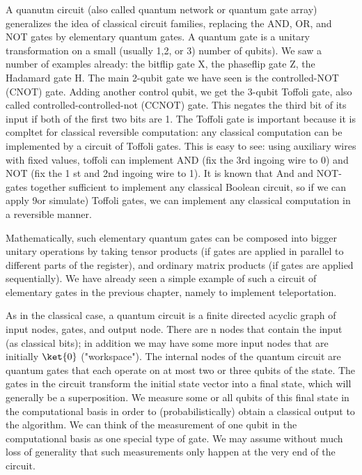 \documentclass[12pt, oneside]{book}
\theoremstyle{definition}
\theoremstyle{definition}
\theoremstyle{remark}
\begin{document}
A quanutm circuit (also called quantum network or quantum gate array) generalizes the idea of classical circuit families, replacing the AND, OR, and NOT gates by elementary quantum gates. A quantum gate is a unitary transformation on a small (usually 1,2, or 3) number of qubits). We saw a number of examples already: the bitflip gate X, the phaseflip gate Z, the Hadamard gate H. The main 2-qubit gate we have seen is the controlled-NOT (CNOT) gate. Adding another control qubit, we get the 3-qubit Toffoli gate, also called controlled-controlled-not (CCNOT) gate. This negates the third bit of its input if both of the first two bits are 1. The Toffoli gate is important because it is compltet for classical reversible computation: any classical computation can be implemented by a circuit of Toffoli gates. This is easy to see: using auxiliary wires with fixed values, toffoli can implement AND (fix the 3rd ingoing wire to 0) and NOT (fix the 1 st and 2nd ingoing wire to 1). It is known that And and NOT-gates together sufficient to implement any classical Boolean circuit, so if we can apply 9or simulate) Toffoli gates, we can implement any classical computation in a reversible manner.

Mathematically, such elementary quantum gates can be composed into bigger unitary operations by taking tensor products (if gates are applied in parallel to different parts of the register), and ordinary matrix products (if gates are applied sequentially). We have already seen a simple example of such a circuit of elementary gates in the previous chapter, namely to implement teleportation.

As in the classical case, a quantum circuit is a finite directed acyclic graph of input nodes, gates, and output node. There are n nodes that contain the input (as classical bits); in addition we may have some more input nodes that are initially $\ket{0}$ ("workspace"). The internal nodes of the quantum circuit are quantum gates that each operate on at most two or three qubits of the state. The gates in the circuit transform the initial state vector into a final state, which will generally be a superposition. We measure some or all qubits of this final state in the computational basis in order to (probabilistically) obtain a classical output to the algorithm. We can think of the measurement of one qubit in the computational basis as one special type of gate. We may assume without much loss of generality that such measurements only happen at the very end of the circuit. 
\end{document}
